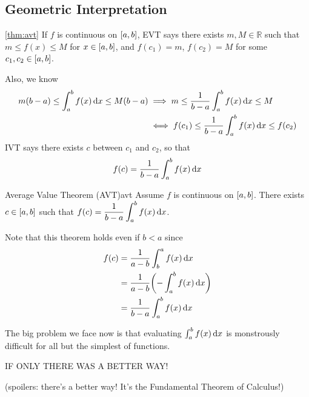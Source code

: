 \subsection*{Geometric Interpretation}
\begin{Proof}{\ref{thm:avt}}{}
    If $ f $ is continuous on $ \interval{a}{b} $, EVT says there exists $ m,M\in\mathbb{R} $ such that
    $ \displaystyle m\le f(x) \le M $
    for $ x\in\interval{a}{b} $, and $ f(c_1)=m $, $ f(c_2)=M $ for some $ c_1,c_2\in\interval{a}{b} $.

    Also, we know
    \begin{align*}
        m(b-a)\le \int_{a}^{b} f(x)\odif{x} \le M(b-a)
         & \implies m\le \frac{1}{b-a} \int_{a}^{b} f(x)\odif{x} \le M       \\
         & \iff f(c_1)\le \frac{1}{b-a} \int_{a}^{b} f(x)\odif{x} \le f(c_2) \\
    \end{align*}
    IVT says there exists $ c $ between $ c_1 $ and $ c_2 $, so that
    \[ f(c)=\frac{1}{b-a} \int_{a}^{b} f(x)\odif{x} \]
\end{Proof}

\begin{Theorem}{Average Value Theorem (AVT)}{avt}
    Assume $ f $ is continuous on $ \interval{a}{b} $.
    There exists $ c\in\interval{a}{b} $ such that
    $ \displaystyle f(c)=\frac{1}{b-a} \int_{a}^{b} f(x)\odif{x} $.
\end{Theorem}

\begin{Remark}{}{}
    Note that this theorem holds even if $ b<a $ since
    \begin{align*}
        f(c) & =\frac{1}{a-b} \int_{b}^{a} f(x)\odif{x}               \\
             & =\frac{1}{a-b}\biggl(-\int_{a}^{b} f(x)\odif{x}\biggr) \\
             & =\frac{1}{b-a} \int_{a}^{b} f(x)\odif{x}
    \end{align*}
\end{Remark}

The big problem we face now is that evaluating $ \int_{a}^{b} f(x)\odif{x} $ is
monstrously difficult for all but the simplest of functions.

IF ONLY THERE WAS A BETTER WAY\@!

(spoilers: there's a better way! It's the Fundamental Theorem of Calculus!)

